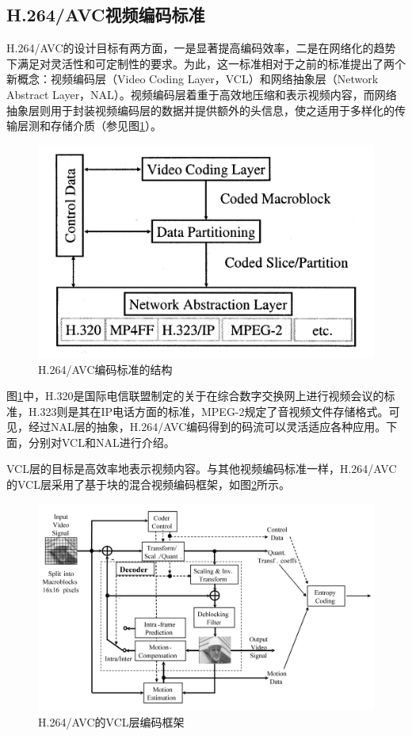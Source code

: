 \subsection{H.264/AVC视频编码标准}

H.264/AVC的设计目标有两方面，一是显著提高编码效率，二是在网络化的趋势下满足对灵活性和可定制性的要求。为此，这一标准相对于之前的标准提出了两个新概念：视频编码层（Video Coding Layer，VCL）和网络抽象层（Network Abstract Layer，NAL）。视频编码层着重于高效地压缩和表示视频内容，而网络抽象层则用于封装视频编码层的数据并提供额外的头信息，使之适用于多样化的传输层测和存储介质（参见图\ref{fig:02}\supercite{H.264-Overview}）。

\begin{figure}[h]
	\centering
	\includegraphics[width = 0.6\linewidth]{clip/02.png}
	\caption{H.264/AVC编码标准的结构\label{fig:02}}
\end{figure}

图\ref{fig:02}中，H.320是国际电信联盟制定的关于在综合数字交换网上进行视频会议的标准，H.323则是其在IP电话方面的标准，MPEG-2规定了音视频文件存储格式。可见，经过NAL层的抽象，H.264/AVC编码得到的码流可以灵活适应各种应用。下面，分别对VCL和NAL进行介绍。

VCL层的目标是高效率地表示视频内容。与其他视频编码标准一样，H.264/AVC的VCL层采用了基于块的混合视频编码框架，如图\ref{fig:03}\supercite{H.264-Overview}所示。

\begin{figure}[h]
	\centering
	\includegraphics[width = 1.0\linewidth]{clip/03.png}
	\caption{H.264/AVC的VCL层编码框架\label{fig:03}}
\end{figure}

